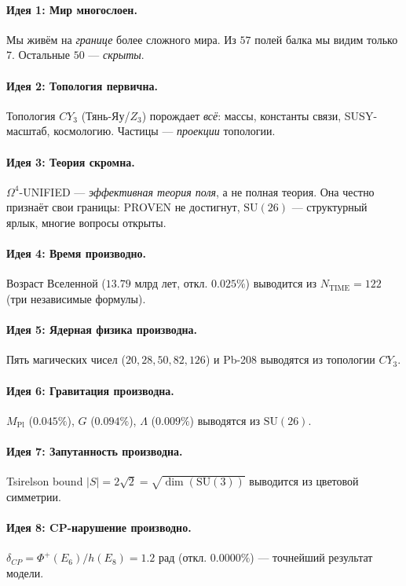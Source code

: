 \documentclass[11pt,a4paper]{article}
\newcommand{\SU}{\mathrm{SU}}
\newcommand{\CY}{CY_3}
\newcommand{\Om}{\Omega^4}
\newcommand{\Mpl}{M_{\text{Pl}}}
\theoremstyle{definition}
\begin{document}
\paragraph{Идея 1: Мир многослоен.}
Мы живём на \emph{границе} более сложного мира. Из $57$ полей 
балка мы видим только $7$. Остальные $50$ — \emph{скрыты}.

\paragraph{Идея 2: Топология первична.}
Топология $\CY$ (Тянь-Яу/$Z_3$) порождает \emph{всё}: массы, 
константы связи, SUSY-масштаб, космологию. Частицы — 
\emph{проекции} топологии.

\paragraph{Идея 3: Теория скромна.}
$\Om$-UNIFIED — \emph{эффективная теория поля}, а не полная 
теория. Она честно признаёт свои границы: PROVEN не достигнут, 
$\SU(26)$ — структурный ярлык, многие вопросы открыты.

\paragraph{Идея 4: Время производно.}
Возраст Вселенной ($13.79$ млрд лет, откл. $0.025\%$) 
выводится из $N_{\text{TIME}} = 122$ (три независимые формулы).

\paragraph{Идея 5: Ядерная физика производна.}
Пять магических чисел ($20, 28, 50, 82, 126$) и Pb-208 
выводятся из топологии $\CY$.

\paragraph{Идея 6: Гравитация производна.}
$\Mpl$ ($0.045\%$), $G$ ($0.094\%$), $\Lambda$ 
($\mathbf{0.009\%}$) выводятся из $\SU(26)$.

\paragraph{Идея 7: Запутанность производна.}
Tsirelson bound $|S| = 2\sqrt{2} = \sqrt{\dim(\SU(3))}$ 
выводится из цветовой симметрии.

\paragraph{Идея 8: CP-нарушение производно.}
$\delta_{CP} = \Phi^+(E_6)/h(E_8) = 1.2$ рад (откл. 
$\mathbf{0.0000\%}$) — точнейший результат модели.
\end{document}
